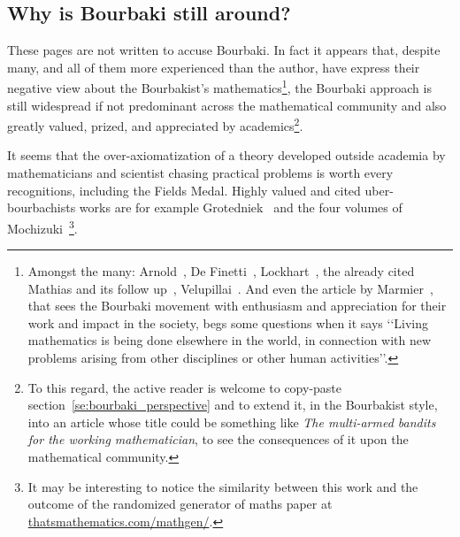 \documentclass[]{scrartcl}
\theoremstyle{definition}
\begin{document}
\subsection*{Why is Bourbaki still around?}






These pages are not written to accuse Bourbaki. 
In fact it appears that, despite many, and all of them more experienced than the author, have express their negative view about the Bourbakist's mathematics\footnote{
    Amongst the many: Arnold~\cite{arnol1998teaching}, De Finetti~\cite{de2008bruno}, Lockhart~\cite{lockhart2009mathematician}, the already cited Mathias and its follow up~\cite{mathias1998further}, Velupillai~\cite{velupillai2012bourbaki}. And even the article by Marmier~\cite{marmier2014idea}, that sees the Bourbaki movement with enthusiasm and appreciation for their work and impact in the society, begs some questions when it says
    \lq\lq Living mathematics is being done elsewhere in the world, in connection with new problems arising from other disciplines or other human activities\rq\rq.
}, the Bourbaki approach is still widespread if not predominant across the mathematical community and also greatly valued, prized, and appreciated by academics\footnote{
    To this regard, the active reader is welcome to copy-paste section~\ref{se:bourbaki_perspective} and to extend it, in the Bourbakist style, into an article whose title could be something like \emph{The multi-armed bandits for the working mathematician}, to see the consequences of it upon the mathematical community.
}.

It seems that the over-axiomatization of a theory developed outside academia by mathematicians and scientist chasing practical problems is worth every recognitions, including the Fields Medal.
Highly valued and cited uber-bourbachists works are for example Grotedniek~\cite{grothendieck2011some} and the four volumes of Mochizuki~\cite{mochizuki2012inter}\footnote{
    It may be interesting to notice the similarity between this work and the outcome of the randomized generator of maths paper at \href{https://thatsmathematics.com/mathgen/}{thatsmathematics.com/mathgen/}.
}. 
\end{document}
